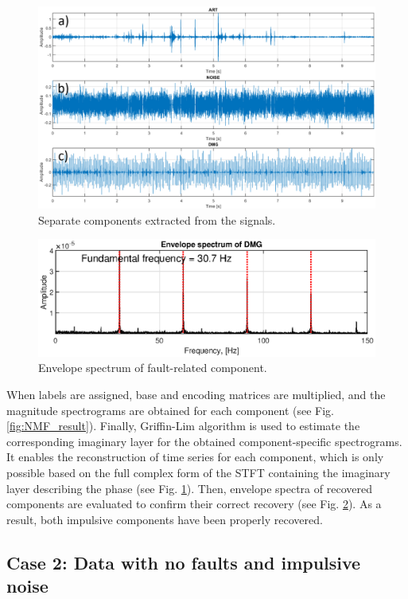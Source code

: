 \documentclass[3p,times]{elsarticle}
\begin{document}
\begin{figure}[ht!]
\centering
\includegraphics[width=.95\textwidth]{figs/out.png}
\caption{Separate components extracted from the signals.} 
\label{fig:NMF_out}
\end{figure}

\begin{figure}[ht!]
\centering
\includegraphics[width=.8\textwidth]{figs/spec.eps}
\caption{Envelope spectrum of fault-related component.}
\label{fig:NMF_outspec}
\end{figure}

When labels are assigned, base and encoding matrices are multiplied, and the magnitude spectrograms are obtained for each component (see Fig. \ref{fig:NMF_result}). Finally, Griffin-Lim algorithm is used to estimate the corresponding imaginary layer for the obtained component-specific spectrograms. It enables the reconstruction of time series for each component, which is only possible based on the full complex form of the STFT containing the imaginary layer describing the phase (see Fig. \ref{fig:NMF_out}). Then, envelope spectra of recovered components are evaluated to confirm their correct recovery (see Fig. \ref{fig:NMF_outspec}). As a result, both impulsive components have been properly recovered.

\subsection{Case 2: Data with no faults and impulsive noise}
\end{document}

